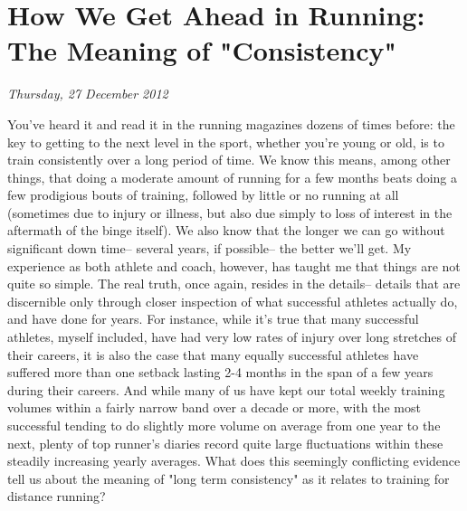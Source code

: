 \chapter{How We Get Ahead in Running: The Meaning of "Consistency"}
\textit{Thursday, 27 December 2012}
\bigskip

You've heard it and read it in the running magazines dozens of times before: the key to getting to the next level in the sport, whether you're young or old, is to train consistently over a long period of time. We know this means, among other things, that doing a moderate amount of running for a few months beats doing a few prodigious bouts of training, followed by little or no running at all (sometimes due to injury or illness, but also due simply to loss of interest in the aftermath of the binge itself). We also know that the longer we can go without significant down time-- several years, if possible-- the better we'll get. My experience as both athlete and coach, however, has taught me that things are not quite so simple. The real truth, once again, resides in the details-- details that are discernible only through closer inspection of what successful athletes actually do, and have done for years. For instance, while it's true that many successful athletes, myself included, have had very low rates of injury over long stretches of their careers, it is also the case that many equally successful athletes have suffered more than one setback lasting 2-4 months in the span of a few years during their careers. And while many of us have kept our total weekly training volumes within a fairly narrow band over a decade or more, with the most successful tending to do slightly more volume on average from one year to the next, plenty of top runner's diaries record quite large fluctuations within these steadily increasing yearly averages. What does this seemingly conflicting evidence tell us about the meaning of "long term consistency" as it relates to training for distance running?

